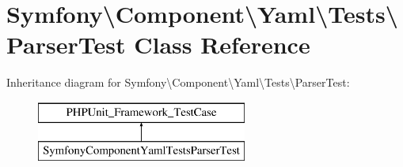 \hypertarget{classSymfony_1_1Component_1_1Yaml_1_1Tests_1_1ParserTest}{}\section{Symfony\textbackslash{}Component\textbackslash{}Yaml\textbackslash{}Tests\textbackslash{}Parser\+Test Class Reference}
\label{classSymfony_1_1Component_1_1Yaml_1_1Tests_1_1ParserTest}
Inheritance diagram for Symfony\textbackslash{}Component\textbackslash{}Yaml\textbackslash{}Tests\textbackslash{}Parser\+Test\+:\begin{figure}[H]
\begin{center}
\leavevmode
\includegraphics[height=2.000000cm]{classSymfony_1_1Component_1_1Yaml_1_1Tests_1_1ParserTest}
\end{center}
\end{figure}
